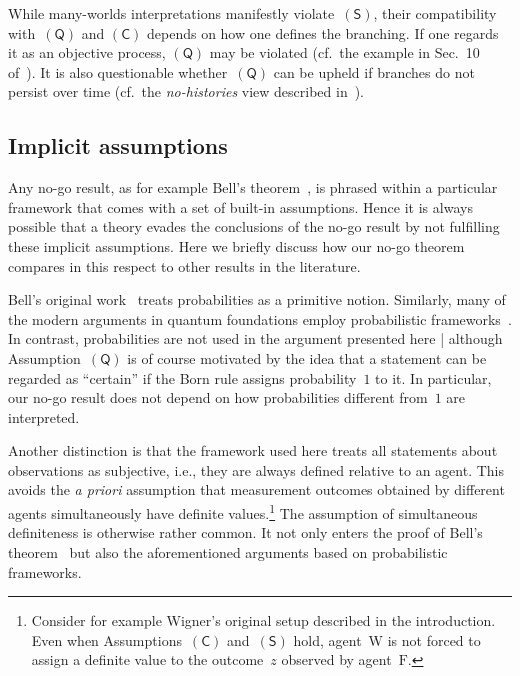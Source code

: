 \documentclass[12pt]{article}
\theoremstyle{mystyle}
\theoremstyle{definition}
\newcommand*{\Friend}{\mathrm{F}}
\newcommand*{\Wigner}{\mathrm{W}}
\newcommand*{\QT}{\mathsf{(Q)}}
\newcommand*{\SW}{\mathsf{(S)}}
\newcommand*{\SelfCons}{\mathsf{(C)}}
\begin{document}
While many-worlds interpretations manifestly violate~$\SW$, their compatibility with~$\QT$ and $\SelfCons$ depends on how one defines the branching. If one regards it as an objective process, $\QT$ may be violated  (cf.\ the example in Sec.~10 of~\cite{Vaidman98}).  It is also questionable whether~$\QT$ can be upheld if branches do not persist over time (cf.\ the \emph{no-histories} view described in~\cite{Butterfield95}).

\smallskip
 
\subsection{Implicit assumptions}

Any no-go result, as for example Bell's theorem~\cite{Bell66}, is phrased within a particular framework that comes with a set of built-in assumptions. Hence it is always possible that a theory evades the conclusions of the no-go result by not fulfilling these implicit assumptions. Here we briefly discuss how our no-go theorem compares in this respect to other results in the literature. 

Bell's original work~\cite{Bell66} treats probabilities as a primitive notion. Similarly, many of the modern arguments in quantum foundations  employ  probabilistic frameworks~\cite{Barrett07,Hardy11,ChDaPe11,MasMul11,ColRen12,PuBaRu12,LeiSpe13,BarWil16}.  In contrast, probabilities are not used in the argument presented here | although Assumption~$\QT$ is of course motivated by the idea that a statement can be regarded as ``certain'' if the Born rule assigns probability~$1$ to it. In particular, our no-go result does not depend  on how probabilities different from~$1$ are interpreted.  

Another distinction is that the framework used here treats all statements about observations as subjective, i.e., they are always defined relative to an agent. This avoids the  \emph{a priori} assumption that  measurement outcomes obtained by  different agents simultaneously have definite values.\footnote{Consider for example Wigner's original setup described in the introduction. Even when Assumptions~$\SelfCons$ and~$\SW$ hold,  agent~$\Wigner$ is not  forced to assign a definite value to the outcome~$z$ observed by agent~$\Friend$.} The assumption of simultaneous definiteness is otherwise rather common. It not only enters the proof of Bell's theorem~\cite{Bell66} but also the aforementioned arguments based on probabilistic frameworks. 
\end{document}

